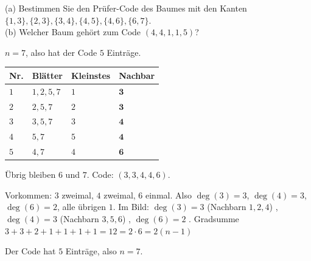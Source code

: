 \begin{aufgabe}
(a) Bestimmen Sie den Prüfer-Code des Baumes mit den Kanten $\{1,3\}, \{2,3\}, \{3,4\}, \{4,5\}, \{4,6\}, \{6,7\}$.\\
(b) Welcher Baum gehört zum Code $(4,4,1,1,5)$?

\loesung
{}
\begin{center}
\end{center}

$n = 7$, also hat der Code $5$ Einträge.

\begin{center}
{\small
\renewcommand{\arraystretch}{1.4}
\begin{tabular}{@{}P{1.0cm}P{2.6cm}P{1.6cm}P{1.6cm}@{}}
\toprule
\textbf{Nr.} & \textbf{Blätter} & \textbf{Kleinstes} & \textbf{Nachbar}\\
\midrule
$1$ & $1,2,5,7$ & $1$ & $\mathbf{3}$\\
$2$ & $2,5,7$ & $2$ & $\mathbf{3}$\\
$3$ & $3,5,7$ & $3$ & $\mathbf{4}$\\
$4$ & $5,7$ & $5$ & $\mathbf{4}$\\
$5$ & $4,7$ & $4$ & $\mathbf{6}$\\
\bottomrule
\end{tabular}}
\end{center}
Übrig bleiben $6$ und $7$. Code: $(3,3,4,4,6)$.

Vorkommen: $3$ zweimal, $4$ zweimal, $6$ einmal. Also $\deg(3) = 3$, $\deg(4) = 3$, $\deg(6) = 2$, alle übrigen $1$.
Im Bild: $\deg(3) = 3$ (Nachbarn $1,2,4$) \checkmark, $\deg(4) = 3$ (Nachbarn $3,5,6$) \checkmark, $\deg(6) = 2$ \checkmark.
Gradsumme $3+3+2+1+1+1+1 = 12 = 2 \cdot 6 = 2(n-1)$ \checkmark

Der Code hat $5$ Einträge, also $n = 7$.


\end{aufgabe}
